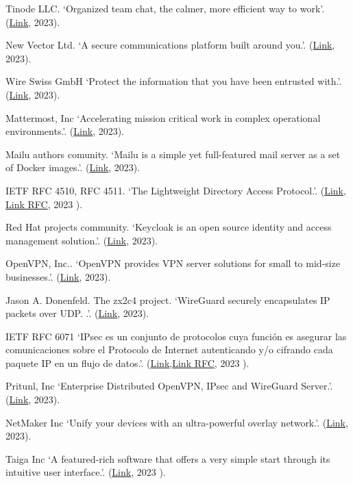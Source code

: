 \documentclass[spanish,final]{setup/eetac_tfc_pfc}
\begin{document}
\begin{thebibliography}{2}
Tinode LLC.
`Organized team chat, the calmer, more efficient way to work'.
(\href{https://zulip.com/}{Link}, 2023).

New Vector Ltd.
`A secure communications platform built around you.'.
(\href{https://element.io/}{Link}, 2023).

Wire Swiss GmbH
`Protect the information that you have been entrusted with.'.
(\href{https://wire.com/en/}{Link}, 2023).

Mattermost, Inc
`Accelerating mission critical work in complex operational environments.'.
(\href{https://mattermost.com/}{Link}, 2023).

Mailu authors comunity.
`Mailu is a simple yet full-featured mail server as a set of Docker images.'.
(\href{https://mailu.io/2.0/}{Link}, 2023).

IETF RFC 4510, RFC 4511.
`The Lightweight Directory Access Protocol.'.
(\href{https://en.wikipedia.org/wiki/Lightweight_Directory_Access_Protocol}{Link}, \href{https://datatracker.ietf.org/doc/html/rfc4511}{Link RFC}, 2023 ).

Red Hat projects community.
`Keycloak is an open source identity and access management solution.'.
(\href{https://www.keycloak.org/}{Link}, 2023).

OpenVPN, Inc..
`OpenVPN provides VPN server solutions for small to mid-size businesses.'.
(\href{https://openvpn.net/}{Link}, 2023).

Jason A. Donenfeld. The zx2c4 project.
`WireGuard securely encapsulates IP packets over UDP. .'.
(\href{https://www.wireguard.com/}{Link}, 2023).

IETF RFC 6071
`IPsec es un conjunto de protocolos cuya función es asegurar las comunicaciones sobre el Protocolo de Internet autenticando y/o cifrando cada paquete IP en un flujo de datos.'.
(\href{https://en.wikipedia.org/wiki/IPsec}{Link},\href{https://datatracker.ietf.org/doc/html/rfc6071}{Link RFC}, 2023 ).

Pritunl, Inc
`Enterprise Distributed OpenVPN, IPsec and WireGuard Server.'.
(\href{https://pritunl.com/}{Link}, 2023).

NetMaker Inc
`Unify your devices with an ultra-powerful overlay network.'.
(\href{https://www.netmaker.io/}{Link}, 2023).

Taiga Inc
`A featured-rich software that offers a very simple start through its intuitive user interface.'.
(\href{https://taiga.io/}{Link}, 2023 ).


\end{thebibliography}
\end{document}
